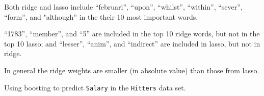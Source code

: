 \documentclass[11pt]{exam} %
\newenvironment{code}%
   {\par\noindent\adjustbox{margin=1ex,bgcolor=shadecolor,margin=0ex \medskipamount}\bgroup\minipage\linewidth\verbatim}%
   {\endverbatim\endminipage\egroup}
\begin{document}
\begin{questions}
\begin{parts}
\begin{subparts}
Both ridge and lasso include ``februari'', ``upon'', ``whilst'', ``within'', ``sever'', ``form'', and "although'' in the their 10 most important words.
\smallskip

``1783'', ``member'', and ``5'' are included in the top 10 ridge words, but not in the top 10 lasso; and ``lesser'', ``anim'', and ``indirect'' are included in lasso, but not in ridge.
\smallskip

In general the ridge weights are smaller (in absolute value) than those from lasso.

\end{subparts}


\end{parts}











Using boosting to predict \texttt{Salary} in the \texttt{Hitters} data set.

\end{questions}
\end{document}
